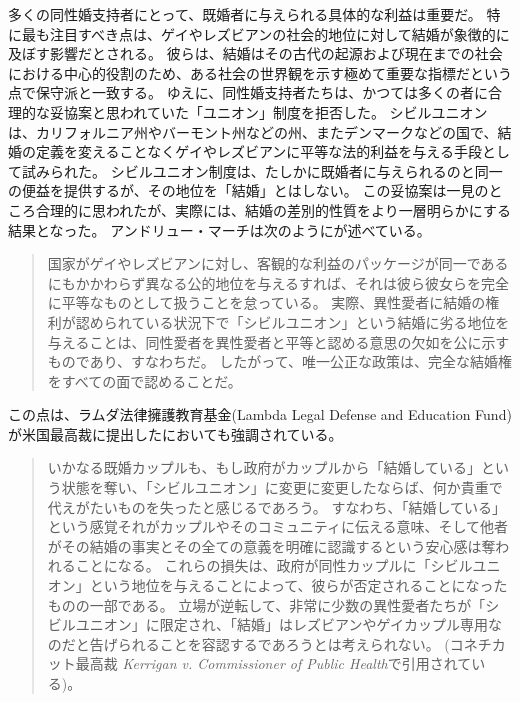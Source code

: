 \documentclass[paper=a4,book,openany]{jlreq} \usepackage{mystyle}
\begin{document}
多くの同性婚支持者にとって、既婚者に与えられる具体的な利益は重要だ。
特に最も注目すべき点は、ゲイやレズビアンの社会的地位に対して結婚が象徴的に及ぼす影響だとされる。
彼らは、結婚はその古代の起源および現在までの社会における中心的役割のため、ある社会の世界観を示す極めて重要な指標だという点で保守派と一致する。
ゆえに、同性婚支持者たちは、かつては多くの者に合理的な妥協案と思われていた「ユニオン」制度を拒否した。
シビルユニオンは、カリフォルニア州やバーモント州などの州、またデンマークなどの国で、結婚の定義を変えることなくゲイやレズビアンに平等な法的利益を与える手段として試みられた。
シビルユニオン制度は、たしかに既婚者に与えられるのと同一の便益を提供するが、その地位を「結婚」とはしない。
この妥協案は一見のところ合理的に思われたが、実際には、結婚の差別的性質をより一層明らかにする結果となった。
アンドリュー・マーチは次のようにが述べている。

\begin{quote}
国家がゲイやレズビアンに対し、客観的な利益のパッケージが同一であるにもかかわらず異なる公的地位を与えるすれば、それは彼ら彼女らを完全に平等なものとして扱うことを怠っている。
実際、異性愛者に結婚の権利が認められている状況下で「シビルユニオン」という結婚に劣る地位を与えることは、同性愛者を異性愛者と平等と認める意思の欠如を公に示すものであり、すなわちだ。
したがって、唯一公正な政策は、完全な結婚権をすべての面で認めることだ。\citep[p.254]{march11:_is_there_right_polyg}
\end{quote}

この点は、ラムダ法律擁護教育基金(Lambda Legal Defense and Education Fund)が米国最高裁に提出したにおいても強調されている。

\begin{quote}
いかなる既婚カップルも、もし政府がカップルから「結婚している」という状態を奪い、「シビルユニオン」に変更に変更したならば、何か貴重で代えがたいものを失ったと感じるであろう。
すなわち、「結婚している」という感覚{\DDASH}それがカップルやそのコミュニティに伝える意味、そして他者がその結婚の事実とその全ての意義を明確に認識するという安心感{\DDASH}は奪われることになる。
これらの損失は、政府が同性カップルに「シビルユニオン」という地位を与えることによって、彼らが否定されることになったものの一部である。
立場が逆転して、非常に少数の異性愛者たちが「シビルユニオン」に限定され、「結婚」はレズビアンやゲイカップル専用なのだと告げられることを容認するであろうとは考えられない。
(コネチカット最高裁 \emph{Kerrigan v. Commissioner of Public Health}で引用されている)。
\end{quote}
\end{document}
